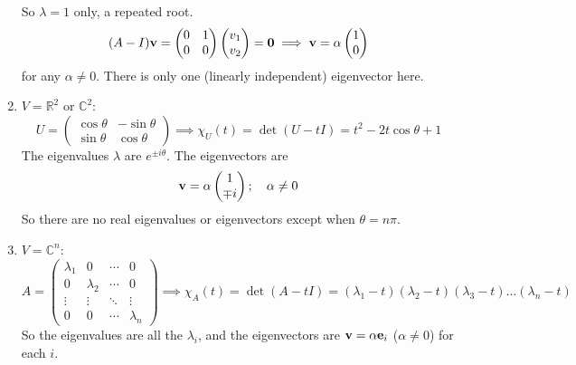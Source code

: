 \begin{enumerate}
\[	      \]
	      So \(\lambda = 1\) only, a repeated root.
	      \[
		      (A - I)\vb v = \begin{pmatrix}
			      0 & 1 \\ 0 & 0
		      \end{pmatrix}\begin{pmatrix}
			      v_1 \\ v_2
		      \end{pmatrix} = \vb 0 \implies \vb v = \alpha\begin{pmatrix}
			      1 \\ 0
		      \end{pmatrix}
	      \]
	      for any \(\alpha \neq 0\).
	      There is only one (linearly independent) eigenvector here.
	\item \(V = \mathbb R^2\) or \(\mathbb C^2\):
	      \[
		      U = \begin{pmatrix}
			      \cos\theta & -\sin\theta \\ \sin\theta & \cos\theta
		      \end{pmatrix} \implies \chi_U(t) = \det(U - tI) = t^2 - 2t\cos\theta + 1
	      \]
	      The eigenvalues \(\lambda\) are \(e^{\pm i \theta}\).
	      The eigenvectors are
	      \[
		      \vb v = \alpha \begin{pmatrix}
			      1 \\ \mp i
		      \end{pmatrix};\quad \alpha \neq 0
	      \]
	      So there are no real eigenvalues or eigenvectors except when \(\theta = n \pi\).
	\item \(V = \mathbb C^n\):
	      \[
		      A = \begin{pmatrix}
			      \lambda_1 & 0         & \cdots & 0         \\
			      0         & \lambda_2 & \cdots & 0         \\
			      \vdots    & \vdots    & \ddots & \vdots    \\
			      0         & 0         & \cdots & \lambda_n
		      \end{pmatrix} \implies \chi_A(t) = \det(A - tI) = (\lambda_1 - t)(\lambda_2 - t)(\lambda_3 - t)\dots(\lambda_n - t)
	      \]
	      So the eigenvalues are all the \(\lambda_i\), and the eigenvectors are \(\vb v = \alpha \vb e_i\) (\(\alpha \neq 0\)) for each \(i\).
\end{enumerate}

